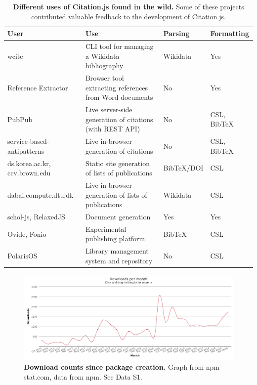 \documentclass[fleqn,10pt,lineno]{wlpeerj} %
\begin{document}
\begin{table}[bt]
\caption{\textbf{Different uses of Citation.js found in the wild.} Some of these projects contributed valuable feedback to the development of Citation.js.}
\label{table:uses}
\begin{tabular}{|p{3cm}|p{6cm}|l|l|}
\hline
\textbf{User}       & \textbf{Use}                                             & \textbf{Parsing} & \textbf{Formatting} \\ \hline
wcite \citep{Voss2019wikicite/wcite} & CLI tool for managing a Wikidata bibliography            & Wikidata         & Yes                 \\ \hline
Reference Extractor \citep{Zelle2018rmzelle/ref-extractor} & Browser tool extracting references from Word documents   & No               & Yes                 \\ \hline
PubPub \citep{shihipar_pubpub:_2018} & Live server-side generation of citations (with REST API) & No               & CSL, BibTeX         \\ \hline
service-based-antipatterns \citep{Boceck2019xJREB/service-based-antipatterns} & Live in-browser generation of citations                  & No               & CSL, BibTeX         \\ \hline
ds.korea.ac.kr, ccv.brown.edu & Static site generation of lists of publications          & BibTeX/DOI       & CSL                 \\ \hline
dabai.compute.dtu.dk          & Live in-browser generation of lists of publications      & Wikidata         & CSL                 \\ \hline
schol-js, RelaxedJS \citep{null2018schol-js/schol,null2018RelaxedJS/ReLaXed} & Document generation                                      & Yes              & Yes                 \\ \hline
Ovide, Fonio \citep{Mourat2019peritext/ovide,Mourat2019medialab/fonio} & Experimental publishing platform                         & BibTeX           & CSL                 \\ \hline
PolarisOS \citep{Ribeyre2019MyScienceWork/PolarisOS} & Library management system and repository                 & No               & CSL                 \\ \hline
\end{tabular}
\end{table}

\begin{figure}[bt]
\centering
\includegraphics[width=\linewidth]{figures/download_counts.png}
\caption{\textbf{Download counts since package creation.} Graph from npm-stat.com, data from npm. See Data S1.}
\label{fig:downloads}
\end{figure}
\end{document}
